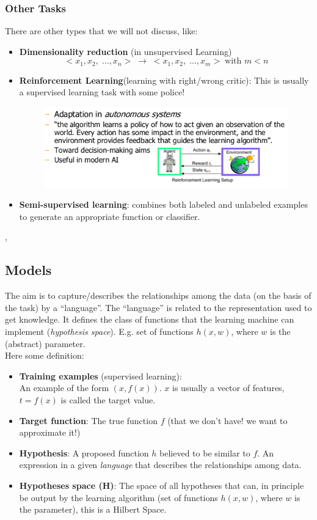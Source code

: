 \documentclass[../main.tex]{subfiles}
\begin{document}
\subsubsection{Other Tasks}
There are other types that we will not discuss, like:
\begin{itemize}
    \item \textbf{Dimensionality reduction} (in unsupervised Learning)
    $$ <x_1, x_2, \; \dots, x_n> \; \rightarrow \; <x_1, x_2, \; \dots, x_m> \; \text{with } m < n  $$
    
    \item \textbf{Reinforcement Learning}(learning with right/wrong critic):
    This is usually a supervised learning task with some police!
    \begin{figure}[H]
        \centering
        \includegraphics[scale = 0.4]{lectures/1_Introduction/Reinforcement_Learning.png}
    \end{figure}

    \item \textbf{Semi-supervised learning}: combines both labeled and unlabeled examples to generate an appropriate function or classifier.
\end{itemize}, 

\subsection{Models}
The aim is to capture/describes the relationships among the data (on the basis of the task) by a “language”. The “language” is related to the representation used to get knowledge. It defines the class of functions that the learning machine can implement (\emph{hypothesis space}). E.g. set of functions $h(x,w)$, where $w$ is the (abstract) parameter.\\

Here some definition:
\begin{itemize}
    \item \textbf{Training examples} (supervised learning):\\
    An example of the form $(x, f(x))$. $x$ is usually a vector of features, $t=f(x)$ is called the target value.
    \item \textbf{Target function}: The true function $f$ (that we don't have! we want to approximate it!)
    \item \textbf{Hypothesis}: A proposed function $h$ believed to be similar to $f$. An expression in a given \emph{language} that describes the relationships among data.
    \item \textbf{Hypotheses space (H)}: The space of all hypotheses that can, in principle be output by the learning algorithm (set of functions $h(x,w)$, where $w$ is the parameter), this is a Hilbert Space.
\end{itemize}
\end{document}
